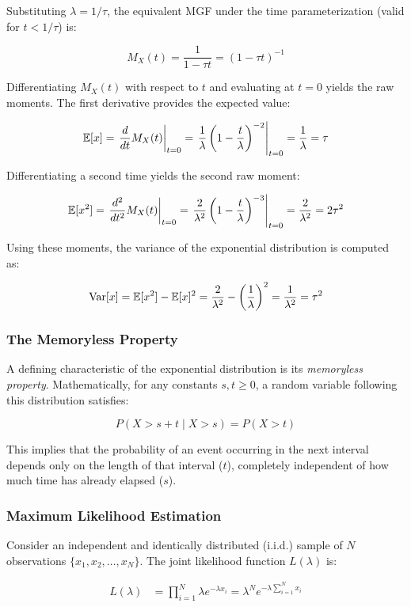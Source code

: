 Substituting $\lambda = 1/\tau$, the equivalent MGF under the time parameterization (valid for $t < 1/\tau$) is:
	
	\[
	M_X(t) = \frac{1}{1 - \tau t} = (1 - \tau t)^{-1}
	\]

Differentiating $M_X(t)$ with respect to $t$ and evaluating at $t = 0$ yields the raw moments. The first derivative provides the expected value:

	\[
	\mathbb{E}[x] = \left. \frac{d}{dt} M_X(t) \right|_{t=0} = \left. \frac{1}{\lambda}\left(1 - \frac{t}{\lambda}\right)^{-2} \right|_{t=0} = \frac{1}{\lambda} = \tau
	\]

Differentiating a second time yields the second raw moment:

	\[
	\mathbb{E}[x^2] = \left. \frac{d^2}{dt^2} M_X(t) \right|_{t=0} = \left. \frac{2}{\lambda^2}\left(1 - \frac{t}{\lambda}\right)^{-3} \right|_{t=0} = \frac{2}{\lambda^2} = 2\tau^2
	\]

Using these moments, the variance of the exponential distribution is computed as:

	\[
	\operatorname{Var}[x] = \mathbb{E}[x^2] - \mathbb{E}[x]^2 = \frac{2}{\lambda^2} - \left(\frac{1}{\lambda}\right)^2 = \frac{1}{\lambda^2} = \tau^2
	\]

\subsubsection{The Memoryless Property}
A defining characteristic of the exponential distribution is its \textit{memoryless property}. Mathematically, for any constants $s, t \ge 0$, a random variable following this distribution satisfies:

	\[
	P(X > s + t \mid X > s) = P(X > t)
	\]

This implies that the probability of an event occurring in the next interval depends only on the length of that interval ($t$), completely independent of how much time has already elapsed ($s$). 

\subsubsection{Maximum Likelihood Estimation}
Consider an independent and identically distributed (i.i.d.) sample of $N$ observations $\{x_1, x_2, \dots, x_N\}$. The joint likelihood function $L(\lambda)$ is:

\begin{align*}
	L(\lambda) &= \prod_{i=1}^N \lambda e^{-\lambda x_i} = \lambda^N e^{-\lambda \sum_{i=1}^N x_i}
\end{align*}

